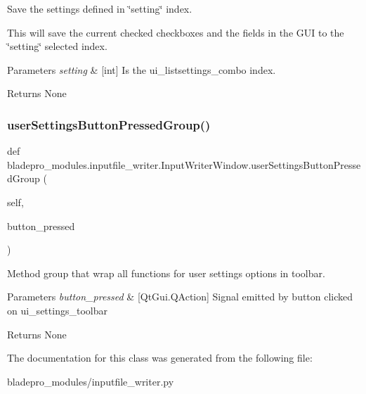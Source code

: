 Save the settings defined in \char`\"{}setting\char`\"{} index. 

This will save the current checked checkboxes and the fields in the G\+UI to the \char`\"{}setting\char`\"{} selected index.


\begin{DoxyParams}{Parameters}
{\em setting} & \mbox{[}int\mbox{]} Is the ui\+\_\+listsettings\+\_\+combo index. \\
\hline
\end{DoxyParams}
\begin{DoxyReturn}{Returns}
None 
\end{DoxyReturn}
\hypertarget{a00073_a1b508dd4cb9c699a1769e7727d1e6fc1}{}\label{a00073_a1b508dd4cb9c699a1769e7727d1e6fc1} 
\subsubsection{\texorpdfstring{user\+Settings\+Button\+Pressed\+Group()}{userSettingsButtonPressedGroup()}}
{\footnotesize\ttfamily def bladepro\+\_\+modules.\+inputfile\+\_\+writer.\+Input\+Writer\+Window.\+user\+Settings\+Button\+Pressed\+Group (\begin{DoxyParamCaption}\item[{}]{self,  }\item[{}]{button\+\_\+pressed }\end{DoxyParamCaption})}



Method group that wrap all functions for user settings options in toolbar. 


\begin{DoxyParams}{Parameters}
{\em button\+\_\+pressed} & \mbox{[}Qt\+Gui.\+Q\+Action\mbox{]} Signal emitted by button clicked on ui\+\_\+settings\+\_\+toolbar \\
\hline
\end{DoxyParams}
\begin{DoxyReturn}{Returns}
None 
\end{DoxyReturn}


The documentation for this class was generated from the following file\+:\begin{DoxyCompactItemize}
\item 
bladepro\+\_\+modules/inputfile\+\_\+writer.\+py\end{DoxyCompactItemize}
